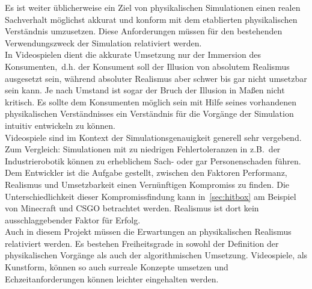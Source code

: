 \label{sec:physical_realism}
Es ist weiter üblicherweise ein Ziel von physikalischen Simulationen einen realen Sachverhalt möglichst akkurat und konform mit dem etablierten physikalischen Verständnis umzusetzen. Diese Anforderungen müssen für den bestehenden Verwendungszweck der Simulation relativiert werden.\\
In Videospielen dient die akkurate Umsetzung nur der Immersion des Konsumenten,~d.h. der Konsument soll der Illusion von absolutem Realismus ausgesetzt sein, während absoluter Realismus aber schwer bis gar nicht umsetzbar sein kann. Je nach Umstand ist sogar der Bruch der Illusion in Maßen nicht kritisch. Es sollte dem Konsumenten möglich sein mit Hilfe seines vorhandenen physikalischen Verständnisses ein Verständnis für die Vorgänge der Simulation intuitiv entwickeln zu können.\\
Videospiele sind im Kontext der Simulationsgenauigkeit generell sehr vergebend. Zum Vergleich: Simulationen mit zu niedrigen Fehlertoleranzen in z.B.~der Industrierobotik können zu erheblichem Sach- oder gar Personenschaden führen.
Dem Entwickler ist die Aufgabe gestellt, zwischen den Faktoren Performanz, Realismus und Umsetzbarkeit einen Vernünftigen Kompromiss zu finden. Die Unterschiedlichkeit dieser Kompromissfindung kann in~\ref{sec:hitbox} am Beispiel von Minecraft und CSGO betrachtet werden. Realismus ist dort kein ausschlaggebender Faktor für Erfolg.\\

Auch in diesem Projekt müssen die Erwartungen an physikalischen Realismus relativiert werden. Es bestehen Freiheitsgrade in sowohl der Definition der physikalischen Vorgänge als auch der algorithmischen Umsetzung. 
Videospiele, als Kunstform, können so auch surreale Konzepte umsetzen und Echzeitanforderungen können leichter eingehalten werden.
